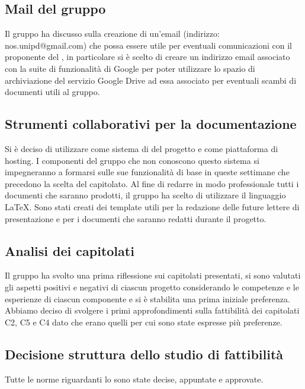 \subsection{Mail del gruppo}
Il gruppo ha discusso sulla creazione di un'email (indirizzo: nos.unipd@gmail.com) che possa essere utile per eventuali comunicazioni con il proponente del , in particolare si è scelto di creare un indirizzo email associato con la suite di funzionalità di Google per poter utilizzare lo spazio di archiviazione del servizio Google Drive ad essa associato per eventuali scambi di documenti utili al gruppo.
\subsection{Strumenti collaborativi per la documentazione}
Si è deciso di utilizzare  come sistema di  del progetto e  come piattaforma di hosting. I componenti del gruppo che non conoscono questo sistema si impegneranno a formarsi sulle sue funzionalità di base in queste settimane che precedono la scelta del capitolato. Al fine di redarre in modo professionale tutti i documenti che saranno prodotti, il gruppo ha scelto di utilizzare il linguaggio \LaTeX. Sono stati creati dei template utili per la redazione delle future lettere di presentazione e per i documenti che saranno redatti durante il progetto.
\subsection{Analisi dei capitolati}
Il gruppo ha svolto una prima riflessione sui capitolati presentati, si sono valutati gli aspetti positivi e negativi di ciascun progetto considerando le competenze e le esperienze di ciascun componente e si è stabilita una prima iniziale preferenza.
Abbiamo deciso di svolgere i primi approfondimenti sulla fattibilità dei capitolati C2, C5 e C4 dato che erano quelli per cui sono state espresse più preferenze.
\subsection{Decisione struttura dello studio di fattibilità}
Tutte le norme riguardanti lo \SdF sono state decise, appuntate e approvate.
